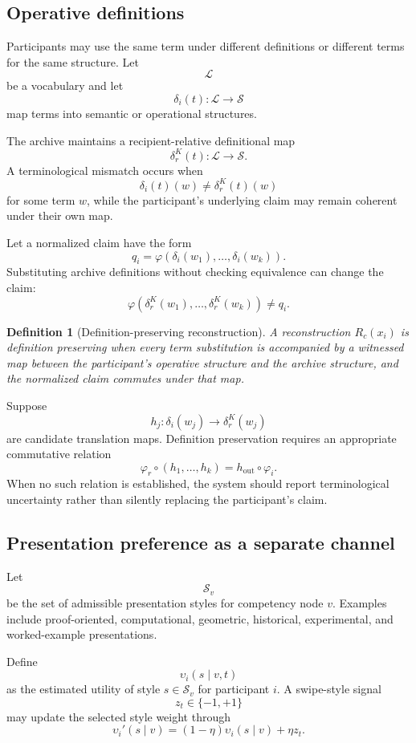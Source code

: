 \documentclass[11pt]{article}
\newtheorem{definition}{Definition}[section]
\theoremstyle{definition}
\begin{document}
\subsection{Operative definitions}

Participants may use the same term under different definitions or different terms for the same structure. Let
\[
\mathcal L
\]
be a vocabulary and let
\[
\delta_i(t):\mathcal L\to\mathcal S
\]
map terms into semantic or operational structures.

The archive maintains a recipient-relative definitional map
\[
\delta_r^K(t):\mathcal L\to\mathcal S.
\]
A terminological mismatch occurs when
\[
\delta_i(t)(w)\neq\delta_r^K(t)(w)
\]
for some term \(w\), while the participant's underlying claim may remain coherent under their own map.

Let a normalized claim have the form
\[
q_i
=
\varphi
\left(
\delta_i(w_1),
\ldots,
\delta_i(w_k)
\right).
\]
Substituting archive definitions without checking equivalence can change the claim:
\[
\varphi
\left(
\delta_r^K(w_1),
\ldots,
\delta_r^K(w_k)
\right)
\neq
q_i.
\]

\begin{definition}[Definition-preserving reconstruction]
A reconstruction \(R_c(x_i)\) is definition preserving when every term substitution is accompanied by a witnessed map between the participant's operative structure and the archive structure, and the normalized claim commutes under that map.
\end{definition}

Suppose
\[
h_j:
\delta_i(w_j)\to\delta_r^K(w_j)
\]
are candidate translation maps. Definition preservation requires an appropriate commutative relation
\[
\varphi_r\circ(h_1,\ldots,h_k)
=
h_{\mathrm{out}}\circ\varphi_i.
\]
When no such relation is established, the system should report terminological uncertainty rather than silently replacing the participant's claim.

\subsection{Presentation preference as a separate channel}

Let
\[
\mathcal S_v
\]
be the set of admissible presentation styles for competency node \(v\). Examples include proof-oriented, computational, geometric, historical, experimental, and worked-example presentations.

Define
\[
\upsilon_i(s\mid v,t)
\]
as the estimated utility of style \(s\in\mathcal S_v\) for participant \(i\). A swipe-style signal
\[
z_t\in\{-1,+1\}
\]
may update the selected style weight through
\[
\upsilon_i'(s\mid v)
=
(1-\eta)\upsilon_i(s\mid v)
+
\eta z_t.
\]
\end{document}
